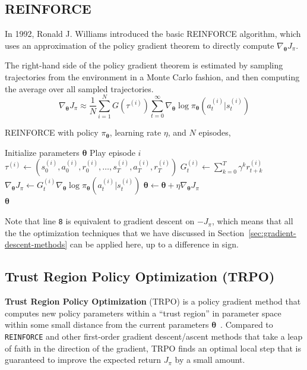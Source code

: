 \documentclass[12pt]{report}
\theoremstyle{definition}
\theoremstyle{remark}
\begin{document}
\subsection{\textsc{REINFORCE}}
In 1992, Ronald J. Williams introduced the basic \textsc{REINFORCE} algorithm, which uses an approximation of the policy gradient theorem to directly compute $\nabla_{\boldsymbol{\theta}} J_\pi$.~\cite{williams_simple_1992}

The right-hand side of the policy gradient theorem is estimated by sampling trajectories from the environment in a Monte Carlo fashion, and then computing the average over all sampled trajectories.
\begin{equation}
    \nabla_{\boldsymbol{\theta}} J_\pi \approx \frac{1}{N} \sum_{i=1}^{N} G(\tau^{(i)}) \sum_{t=0}^{\infty} \nabla_{\boldsymbol{\theta}} \log \pi_{\boldsymbol{\theta}}(a_t^{(i)} | s_t^{(i)})
\end{equation}

\begin{algorithm}
    \caption{\textsc{REINFORCE} with policy $\pi_{\boldsymbol{\theta}}$, learning rate $\eta$, and $N$ episodes, }\label{alg:REINFORCE}
    \begin{algorithmic}[1]
        \State Initialize parameters $\boldsymbol{\theta}$
            \State Play episode $i$
            \State $\tau^{(i)} \leftarrow (s_0^{(i)}, a_0^{(i)}, r_0^{(i)}, \ldots, s_T^{(i)}, a_T^{(i)}, r_T^{(i)})$
                \State $G_t^{(i)} \leftarrow \sum_{k=0}^{T} \gamma^k r_{t+k}^{(i)}$
                \State $\nabla_{\boldsymbol{\theta}} J_\pi \leftarrow G_t^{(i)} \nabla_{\boldsymbol{\theta}} \log \pi_{\boldsymbol{\theta}}(a_t^{(i)} | s_t^{(i)})$
                \State $\boldsymbol{\theta} \leftarrow \boldsymbol{\theta} + \eta \nabla_{\boldsymbol{\theta}} J_\pi$
            \EndFor
        \EndFor \\
        \Return $\boldsymbol{\theta}$
    \end{algorithmic}
\end{algorithm}
Note that line \texttt{8} is equivalent to gradient descent on $-J_\pi$, which means that all the the optimization techniques that we have discussed in Section~\ref{sec:gradient-descent-methods} can be applied here, up to a difference in sign.

\subsection{Trust Region Policy Optimization (TRPO)}
\textbf{Trust Region Policy Optimization} (TRPO) is a policy gradient method that computes new policy parameters within a ``trust region'' in parameter space within some small distance from the current parameters $\boldsymbol{\theta}$~\cite{schulman_trust_2015}. Compared to \texttt{REINFORCE} and other first-order gradient descent/ascent methods that take a leap of faith in the direction of the gradient, TRPO finds an optimal local step that is guaranteed to improve the expected return $J_\pi$ by a small amount.
\end{document}
